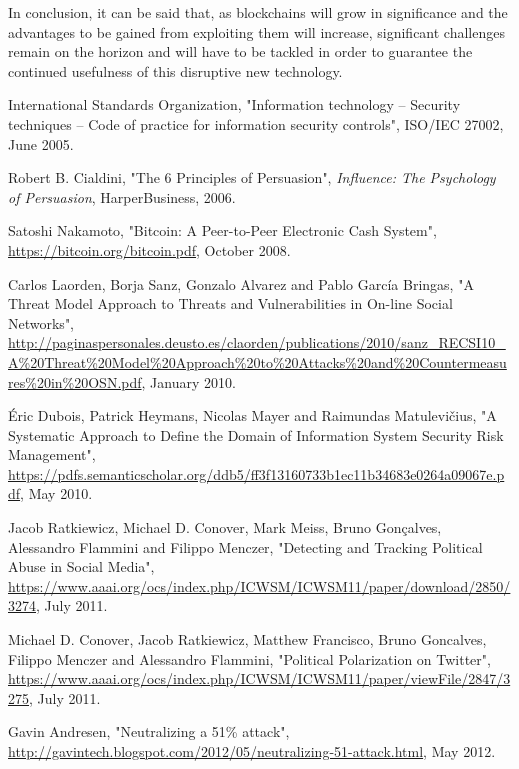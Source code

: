 \documentclass[12pt,a4paper]{article}
\begin{document}
In conclusion, it can be said that, as \gls{blockchain}s will grow in significance and the advantages to be gained from exploiting them will increase, significant challenges remain on the horizon and will have to be tackled in order to guarantee the continued usefulness of this disruptive new technology.\\

\newpage
\begin{thebibliography}{9}

International Standards Organization,
"Information technology -- Security techniques -- Code of practice for information security controls",
ISO/IEC 27002,
June 2005.

Robert B. Cialdini,
"The 6 Principles of Persuasion",
\textit{Influence: The Psychology of Persuasion},
HarperBusiness, 2006.

Satoshi Nakamoto,
"Bitcoin: A Peer-to-Peer Electronic Cash System",
\url{https://bitcoin.org/bitcoin.pdf},
October 2008.

Carlos Laorden, Borja Sanz, Gonzalo Alvarez and Pablo García Bringas,
"A Threat Model Approach to Threats and Vulnerabilities in On-line Social Networks",
\url{http://paginaspersonales.deusto.es/claorden/publications/2010/sanz_RECSI10_A%20Threat%20Model%20Approach%20to%20Attacks%20and%20Countermeasures%20in%20OSN.pdf},
January 2010.

Éric Dubois, Patrick Heymans, Nicolas Mayer and Raimundas Matulevičius,
"A Systematic Approach to Define the Domain of Information System Security Risk Management",
\url{https://pdfs.semanticscholar.org/ddb5/ff3f13160733b1ec11b34683e0264a09067e.pdf},
May 2010.

Jacob Ratkiewicz, Michael D. Conover, Mark Meiss, Bruno Gonçalves, Alessandro Flammini and Filippo Menczer,
"Detecting and Tracking Political Abuse in Social Media",
\url{https://www.aaai.org/ocs/index.php/ICWSM/ICWSM11/paper/download/2850/3274},
July 2011.

Michael D. Conover, Jacob Ratkiewicz, Matthew Francisco, Bruno Goncalves, Filippo Menczer and Alessandro Flammini,
"Political Polarization on Twitter",
\url{https://www.aaai.org/ocs/index.php/ICWSM/ICWSM11/paper/viewFile/2847/3275},
July 2011.

Gavin Andresen,
"Neutralizing a 51\% attack",
\url{http://gavintech.blogspot.com/2012/05/neutralizing-51-attack.html},
May 2012.


\end{thebibliography}
\end{document}
